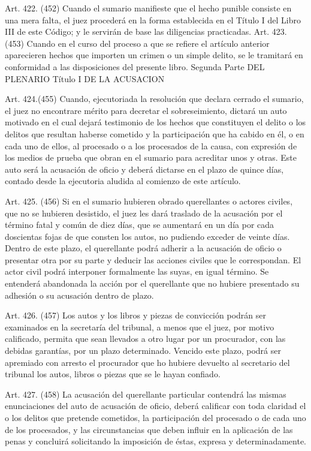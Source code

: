     Art. 422. (452) Cuando el sumario manifieste que el hecho punible consiste en una mera falta, el juez procederá en la forma establecida en el Título I del Libro III de este Código; y le servirán de base las diligencias practicadas.
    Art. 423. (453) Cuando en el curso del proceso a que se refiere el artículo anterior aparecieren hechos que importen un crimen o un simple delito, se le tramitará en conformidad a las disposiciones del presente libro.
  Segunda Parte
  DEL PLENARIO
  Título I
  DE LA ACUSACION

    Art. 424.(455) Cuando, ejecutoriada la resolución que declara cerrado el sumario, el juez no encontrare mérito para decretar el sobreseimiento, dictará un auto motivado en el cual dejará testimonio de los hechos que constituyen el delito o los delitos que resultan haberse cometido y la participación que ha cabido en él, o en cada uno de ellos, al procesado o a los procesados de la causa, con expresión de los medios de prueba que obran en el sumario para acreditar unos y otras. Este auto será la acusación de oficio y deberá dictarse en el plazo de quince días, contado desde la ejecutoria aludida al comienzo de este artículo.



    Art. 425. (456) Si en el sumario hubieren obrado querellantes o actores civiles, que no se hubieren desistido, el juez les dará traslado de la acusación por el término fatal y común de diez días, que se aumentará en un día por cada doscientas fojas de que consten los autos, no pudiendo exceder de veinte días. Dentro de este plazo, el querellante podrá adherir a la acusación de oficio o presentar otra por su parte y deducir las acciones civiles que le correspondan. El actor civil podrá interponer formalmente las suyas, en igual término.
    Se entenderá abandonada la acción por el querellante que no hubiere presentado su adhesión o su acusación dentro de plazo.

    Art. 426. (457) Los autos y los libros y piezas de convicción podrán ser examinados en la secretaría del tribunal, a menos que el juez, por motivo calificado, permita que sean llevados a otro lugar por un procurador, con las debidas garantías, por un plazo determinado. Vencido este plazo, podrá ser apremiado con arresto el procurador que ho hubiere devuelto al secretario del tribunal los autos, libros o piezas que se le hayan confiado.

    Art. 427. (458) La acusación del querellante particular contendrá las mismas enunciaciones del auto de acusación de oficio, deberá calificar con toda claridad el o los delitos que pretende cometidos, la participación del procesado o de cada uno de los procesados, y las circunstancias que deben influir en la aplicación de las penas y concluirá solicitando la imposición de éstas, expresa y determinadamente.


